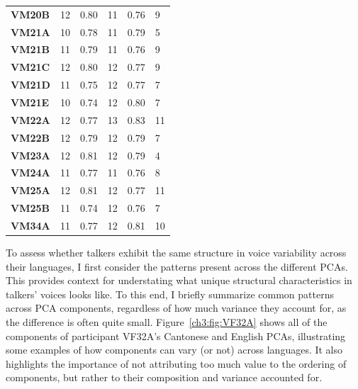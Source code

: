 \begin{table}[htbp]
{\begin{tabular}{llllll}
    \textbf{VM20B} & 12 & 0.80 & 11 & 0.76 & 9 \\
    \textbf{VM21A} & 10 & 0.78 & 11 & 0.79 & 5 \\
    \textbf{VM21B} & 11 & 0.79 & 11 & 0.76 & 9 \\
    \textbf{VM21C} & 12 & 0.80 & 12 & 0.77 & 9 \\
    \textbf{VM21D} & 11 & 0.75 & 12 & 0.77 & 7 \\
    \textbf{VM21E} & 10 & 0.74 & 12 & 0.80 & 7 \\
    \textbf{VM22A} & 12 & 0.77 & 13 & 0.83 & 11 \\
    \textbf{VM22B} & 12 & 0.79 & 12 & 0.79 & 7 \\
    \textbf{VM23A} & 12 & 0.81 & 12 & 0.79 & 4 \\
    \textbf{VM24A} & 11 & 0.77 & 11 & 0.76 & 8 \\
    \textbf{VM25A} & 12 & 0.81 & 12 & 0.77 & 11 \\
    \textbf{VM25B} & 11 & 0.74 & 12 & 0.76 & 7 \\
    \textbf{VM34A} & 11 & 0.77 & 12 & 0.81 & 10 \\
    \bottomrule
    \end{tabular}
}
\end{table}

To assess whether talkers exhibit the same structure in voice variability across their languages, I first consider the patterns present across the different PCAs. This provides context for understating what unique structural characteristics in talkers' voices looks like. To this end, I briefly summarize common patterns across PCA components, regardless of how much variance they account for, as the difference is often quite small. Figure~\ref{ch3:fig:VF32A} shows all of the components of participant VF32A's Cantonese and English PCAs, illustrating some examples of how components can vary (or not) across languages. It also highlights the importance of not attributing too much value to the ordering of components, but rather to their composition and variance accounted for.

